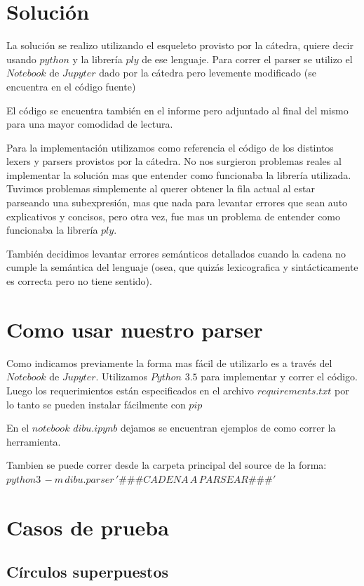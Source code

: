 \documentclass{article}
\theoremstyle{definition}
\theoremstyle{remark}
\begin{document}
\section{Solución}
La solución se realizo utilizando el esqueleto provisto por la cátedra, quiere decir usando $python$ y la librería $ply$ de ese lenguaje.
Para correr el parser se utilizo el $Notebook$ de $Jupyter$ dado por la cátedra pero levemente modificado (se encuentra en el código fuente)

El código se encuentra también en el informe pero adjuntado al final del mismo para una mayor comodidad de lectura.

Para la implementación utilizamos como referencia el código de los distintos lexers y parsers provistos por la cátedra.
No nos surgieron problemas reales al implementar la solución mas que entender como funcionaba la librería utilizada.
Tuvimos problemas simplemente al querer obtener la fila actual al estar parseando una subexpresión, mas que nada para levantar errores que sean auto explicativos y concisos, pero otra vez, fue mas un problema de entender como funcionaba la librería $ply$.

También decidimos levantar errores semánticos detallados cuando la cadena no cumple la semántica del lenguaje (osea, que quizás lexicografica y sintácticamente es correcta pero no tiene sentido).

\section{Como usar nuestro parser}
Como indicamos previamente la forma mas fácil de utilizarlo es a través del $Notebook$ de $Jupyter$.
Utilizamos $Python$ $3.5$ para implementar y correr el código. Luego los requerimientos están especificados en el archivo $requirements.txt$ por lo tanto se pueden instalar fácilmente con $pip$

En el $notebook$ $dibu.ipynb$ dejamos se encuentran ejemplos de como correr la herramienta.

Tambien se puede correr desde la carpeta principal del source de la forma: \\
$python3\, -m\, dibu.parser\,  '\#\#\#CADENA\, A\, PARSEAR\#\#\#'$

\section{Casos de prueba}

\subsection{Círculos superpuestos}
\end{document}
